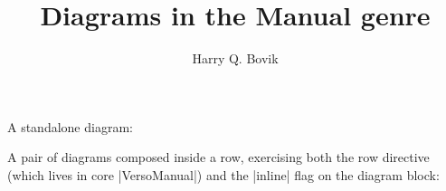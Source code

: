 \documentclass[oneside]{memoir}
\title{\sffamily Diagrams in the Manual genre}
\author{\sffamily Harry Q. Bovik}
\date{\sffamily }
\begin{document}
\frontmatter

\begin{titlingpage}
\maketitle
\end{titlingpage}

\tableofcontents


\cleardoublepage
A standalone diagram:


\begin{center}\end{center}



A pair of diagrams composed inside a row, exercising both the row directive (which lives in
core \LeanVerb|VersoManual|) and the \LeanVerb|inline| flag on the diagram block:


\quad 



\mainmatter
\end{document}
